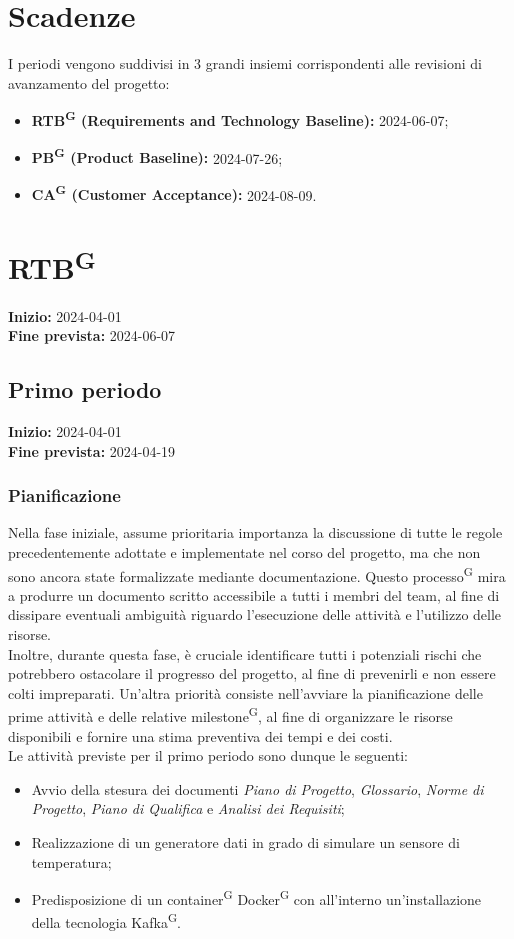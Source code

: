 \documentclass[8pt]{article}
\newcommand{\glossterm}[1]{#1\textsuperscript{G}} %
\begin{document}
\newpage
\section{Scadenze}
I periodi vengono suddivisi in 3 grandi insiemi corrispondenti alle revisioni di avanzamento del progetto:
\begin{itemize}
\setlength\itemsep{0em}
\item \textbf{\glossterm{RTB} (Requirements and Technology Baseline):} 2024-06-07;
\item \textbf{\glossterm{PB} (Product Baseline):} 2024-07-26;
\item \textbf{\glossterm{CA} (Customer Acceptance):} 2024-08-09.
\end{itemize}

\section{\glossterm{RTB}}
\textbf{Inizio:} 2024-04-01\\
\textbf{Fine prevista:} 2024-06-07
\subsection{Primo periodo} \label{sec:1_rtb}
\textbf{Inizio:} 2024-04-01\\
\textbf{Fine prevista:} 2024-04-19
\subsubsection{Pianificazione}
Nella fase iniziale, assume prioritaria importanza la discussione di tutte le regole precedentemente adottate e implementate nel corso del progetto, ma che non sono ancora state formalizzate mediante documentazione. Questo \glossterm{processo} mira a produrre un documento scritto accessibile a tutti i membri del team, al fine di dissipare eventuali ambiguità riguardo l'esecuzione delle attività e l'utilizzo delle risorse.
\\
Inoltre, durante questa fase, è cruciale identificare tutti i potenziali rischi che potrebbero ostacolare il progresso del progetto, al fine di prevenirli e non essere colti impreparati. Un'altra priorità consiste nell'avviare la pianificazione delle prime attività e delle relative \glossterm{milestone}, al fine di organizzare le risorse disponibili e fornire una stima preventiva dei tempi e dei costi. \\
Le attività previste per il primo periodo sono dunque le seguenti:
\begin{itemize}
\setlength{\itemsep}{0em}
    \item Avvio della stesura dei documenti \textit{Piano di Progetto}, \textit{Glossario}, \textit{Norme di Progetto}, \textit{Piano di Qualifica} e \textit{Analisi dei Requisiti};
    \item Realizzazione di un generatore dati in grado di simulare un sensore di temperatura;
    \item Predisposizione di un \glossterm{container} \glossterm{Docker} con all'interno un'installazione della tecnologia \glossterm{Kafka}.
\end{itemize}
\end{document}
